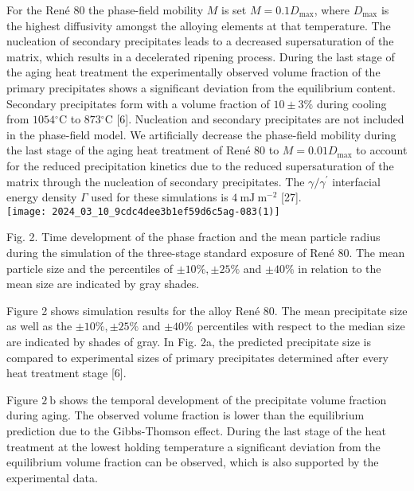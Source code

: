 \documentclass[10pt]{article}
\begin{document}
For the René 80 the phase-field mobility $M$ is set $M=0.1 D_{\max }$, where $D_{\max }$ is the highest diffusivity amongst the alloying elements at that temperature. The nucleation of secondary precipitates leads to a decreased supersaturation of the matrix, which results in a decelerated ripening process. During the last stage of the aging heat treatment the experimentally observed volume fraction of the primary precipitates shows a significant deviation from the equilibrium content. Secondary precipitates form with a volume fraction of $10 \pm 3 \%$ during cooling from $1054{ }^{\circ} \mathrm{C}$ to $873{ }^{\circ} \mathrm{C}$ [6]. Nucleation and secondary precipitates are not included in the phase-field model. We artificially decrease the phase-field mobility during the last stage of the aging heat treatment of René 80 to $M=0.01 D_{\max }$ to account for the reduced precipitation kinetics due to the reduced supersaturation of the matrix through the nucleation of secondary precipitates. The $\gamma / \gamma^{\prime}$ interfacial energy density $\Gamma$ used for these simulations is $4 \mathrm{~mJ} \mathrm{~m}^{-2}$ [27].\\
\texttt{[image: 2024\_03\_10\_9cdc4dee3b1ef59d6c5ag-083(1)]}

Fig. 2. Time development of the phase fraction and the mean particle radius during the simulation of the three-stage standard exposure of René 80. The mean particle size and the percentiles of $\pm 10 \%, \pm 25 \%$ and $\pm 40 \%$ in relation to the mean size are indicated by gray shades.

Figure 2 shows simulation results for the alloy René 80. The mean precipitate size as well as the $\pm 10 \%, \pm 25 \%$ and $\pm 40 \%$ percentiles with respect to the median size are indicated by shades of gray. In Fig. 2a, the predicted precipitate size is compared to experimental sizes of primary precipitates determined after every heat treatment stage [6].

Figure $2 \mathrm{~b}$ shows the temporal development of the precipitate volume fraction during aging. The observed volume fraction is lower than the equilibrium prediction due to the Gibbs-Thomson effect. During the last stage of the heat treatment at the lowest holding temperature a significant deviation from the equilibrium volume fraction can be observed, which is also supported by the experimental data.
\end{document}
